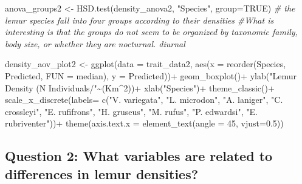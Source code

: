 \documentclass[
  12pt,
]{article}
\newenvironment{Shaded}{\begin{snugshade}}{\end{snugshade}}
\newcommand{\AttributeTok}[1]{\textcolor[rgb]{0.77,0.63,0.00}{#1}}
\newcommand{\CommentTok}[1]{\textcolor[rgb]{0.56,0.35,0.01}{\textit{#1}}}
\newcommand{\ConstantTok}[1]{\textcolor[rgb]{0.00,0.00,0.00}{#1}}
\newcommand{\DecValTok}[1]{\textcolor[rgb]{0.00,0.00,0.81}{#1}}
\newcommand{\FloatTok}[1]{\textcolor[rgb]{0.00,0.00,0.81}{#1}}
\newcommand{\FunctionTok}[1]{\textcolor[rgb]{0.00,0.00,0.00}{#1}}
\newcommand{\NormalTok}[1]{#1}
\newcommand{\OtherTok}[1]{\textcolor[rgb]{0.56,0.35,0.01}{#1}}
\newcommand{\SpecialCharTok}[1]{\textcolor[rgb]{0.00,0.00,0.00}{#1}}
\newcommand{\StringTok}[1]{\textcolor[rgb]{0.31,0.60,0.02}{#1}}
\begin{document}
\begin{Shaded}
\begin{Highlighting}[]
\NormalTok{anova\_groups2 }\OtherTok{\textless{}{-}} \FunctionTok{HSD.test}\NormalTok{(density\_anova2, }\StringTok{"Species"}\NormalTok{, }\AttributeTok{group=}\ConstantTok{TRUE}\NormalTok{)}
\CommentTok{\# the lemur species fall into four groups according to their densities }
\CommentTok{\#What is interesting is that the groups do not seem to be organized by taxonomic family, body size, or whether they are nocturnal. diurnal}

\NormalTok{density\_aov\_plot2 }\OtherTok{\textless{}{-}} \FunctionTok{ggplot}\NormalTok{(}\AttributeTok{data =}\NormalTok{ trait\_data2, }\FunctionTok{aes}\NormalTok{(}\AttributeTok{x =} \FunctionTok{reorder}\NormalTok{(Species, Predicted, }\AttributeTok{FUN =}\NormalTok{ median), }\AttributeTok{y =}\NormalTok{ Predicted))}\SpecialCharTok{+}
  \FunctionTok{geom\_boxplot}\NormalTok{()}\SpecialCharTok{+}
  \FunctionTok{ylab}\NormalTok{(}\StringTok{"Lemur Density (N Individuals/"}\SpecialCharTok{\textasciitilde{}}\NormalTok{(Km}\SpecialCharTok{\^{}}\DecValTok{2}\NormalTok{))}\SpecialCharTok{+}
  \FunctionTok{xlab}\NormalTok{(}\StringTok{"Species"}\NormalTok{)}\SpecialCharTok{+}
  \FunctionTok{theme\_classic}\NormalTok{()}\SpecialCharTok{+}
  \FunctionTok{scale\_x\_discrete}\NormalTok{(}\AttributeTok{labels=} \FunctionTok{c}\NormalTok{(}\StringTok{"V. variegata"}\NormalTok{, }\StringTok{"L. microdon"}\NormalTok{, }\StringTok{"A. laniger"}\NormalTok{, }\StringTok{"C. crossleyi"}\NormalTok{, }\StringTok{"E. rufifrons"}\NormalTok{, }\StringTok{"H. gruseus"}\NormalTok{, }\StringTok{"M. rufus"}\NormalTok{, }\StringTok{"P. edwardsi"}\NormalTok{, }\StringTok{"E. rubriventer"}\NormalTok{))}\SpecialCharTok{+}
  \FunctionTok{theme}\NormalTok{(}\AttributeTok{axis.text.x =} \FunctionTok{element\_text}\NormalTok{(}\AttributeTok{angle =} \DecValTok{45}\NormalTok{, }\AttributeTok{vjust=}\FloatTok{0.5}\NormalTok{))}
\end{Highlighting}
\end{Shaded}

\hypertarget{question-2-what-variables-are-related-to-differences-in-lemur-densities}{%
\subsection{Question 2: What variables are related to differences in
lemur
densities?}\label{question-2-what-variables-are-related-to-differences-in-lemur-densities}}
\end{document}
